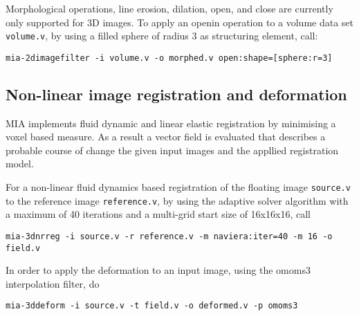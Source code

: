 Morphological operations, line erosion, dilation, open, and close are currently only supported for 3D images. 
To apply an openin operation to a volume data set \texttt{volume.v}, by using a filled sphere of radius 3 as structuring element, 
  call: 
\begin{lstlisting}
mia-2dimagefilter -i volume.v -o morphed.v open:shape=[sphere:r=3]
\end{lstlisting}

\subsection{Non-linear image registration and deformation}

MIA implements fluid dynamic and linear elastic registration by minimising a voxel based measure. 
As a result a vector field is evaluated that describes a probable course of change the given input images and the appllied registration model. 

For a non-linear fluid dynamics based registration of the floating image \texttt{source.v} to the reference image \texttt{reference.v}, by using the 
 adaptive solver algorithm \cite{wollny02comput} with a maximum of 40 iterations and a multi-grid start size of 16x16x16, call 

\begin{lstlisting}
mia-3dnrreg -i source.v -r reference.v -m naviera:iter=40 -m 16 -o field.v 
\end{lstlisting}

\noindent 
In order to apply the deformation to an input image, using the omoms3 interpolation filter, do 
\begin{lstlisting}
mia-3ddeform -i source.v -t field.v -o deformed.v -p omoms3
\end{lstlisting}





